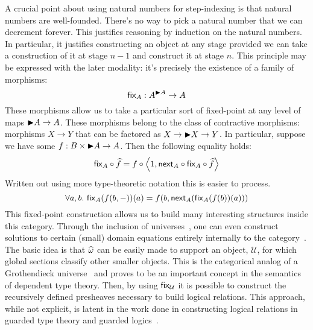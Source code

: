 A crucial point about using natural numbers for step-indexing is that
natural numbers are well-founded. There's no way to pick a natural
number that we can decrement forever. This justifies reasoning by
induction on the natural numbers. In particular, it justifies
constructing an object at any stage provided we can take a
construction of it at stage $n - 1$ and construct it at stage
$n$. This principle may be expressed with the later modality: it's
precisely the existence of a family of morphisms:
\[
  \mathsf{fix}_A : A^{{\blacktriangleright} A} \to A
\]
These morphisms allow us to take a particular sort of fixed-point at
any level of maps ${\blacktriangleright} A \to A$. These morphisms belong to the
class of contractive morphisms: morphisms $X \to Y$ that can be
factored as $X \to {\blacktriangleright} X \to Y$. In particular, suppose we have
some $f : B \times {\blacktriangleright} A \to A$. Then the following equality holds:
\[
  \mathsf{fix}_A \circ \widehat{f} = f \circ \left\langle 1, \mathsf{next}_A \circ \mathsf{fix}_A \circ \widehat{f} \right\rangle
\]
Written out using more type-theoretic notation this is easier to
process.
\[
  \forall a, b.\ \fix_A(f(b, -))(a) = f (b, \delay_A(\fix_A(f(b))(a)))
\]
This fixed-point construction allows us to build many interesting
structures inside this category. Through the inclusion of
universes~\citep{TODO-UNIVERSES}, one can even construct solutions to
certain (small) domain equations entirely internally to the
category~\citep{TODO-QUACK-FIXED-POINTS}. The basic idea is that
$\widehat{\omega}$ can be easily made to support an object,
$\mathcal{U}$, for which global sections classify other smaller
objects. This is the categorical analog of a Grothendieck
universe~\citep{TODO-GROTHENDIECK} and proves to be an important
concept in the semantics of dependent type theory. Then, by using
$\mathsf{fix}_{\mathcal{U}}$ it is possible to construct the recursively defined
presheaves necessary to build logical relations. This approach, while
not explicit, is latent in the work done in constructing logical
relations in guarded type theory and guarded
logics~\citep{TODO-LR-IN-GUARDED}.


